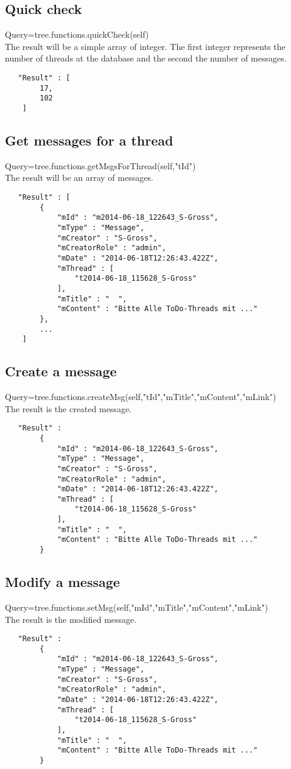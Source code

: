 \documentclass[12pt,a4paper,oneside]{report}
\begin{document}
\subsection{Quick check}
Query=tree.functions.quickCheck(self)\\
The result will be a simple array of integer. The first integer represents the number of threads at the database and the second the number of messages.

\begin{lstlisting}
   "Result" : [  
        17,
        102
    ]
\end{lstlisting}

\subsection{Get messages for a thread}
Query=tree.functions.getMsgsForThread(self,"tId")\\
The result will be an array of messages.
\begin{lstlisting}
   "Result" : [  
        { 
            "mId" : "m2014-06-18_122643_S-Gross",
            "mType" : "Message",
            "mCreator" : "S-Gross",
            "mCreatorRole" : "admin",
            "mDate" : "2014-06-18T12:26:43.422Z",
            "mThread" : [  
                "t2014-06-18_115628_S-Gross"
            ],
            "mTitle" : "  ",
            "mContent" : "Bitte Alle ToDo-Threads mit ..."
        },
        ...
    ]
\end{lstlisting}

\subsection{Create a message}
Query=tree.functions.createMsg(self,"tId","mTitle","mContent","mLink")\\
The result is the created message.
\begin{lstlisting}
   "Result" :   
        { 
            "mId" : "m2014-06-18_122643_S-Gross",
            "mType" : "Message",
            "mCreator" : "S-Gross",
            "mCreatorRole" : "admin",
            "mDate" : "2014-06-18T12:26:43.422Z",
            "mThread" : [  
                "t2014-06-18_115628_S-Gross"
            ],
            "mTitle" : "  ",
            "mContent" : "Bitte Alle ToDo-Threads mit ..."
        }
\end{lstlisting}

\subsection{Modify a message}
Query=tree.functions.setMsg(self,"mId","mTitle","mContent","mLink")\\
The result is the modified message.
\begin{lstlisting}
   "Result" :   
        { 
            "mId" : "m2014-06-18_122643_S-Gross",
            "mType" : "Message",
            "mCreator" : "S-Gross",
            "mCreatorRole" : "admin",
            "mDate" : "2014-06-18T12:26:43.422Z",
            "mThread" : [  
                "t2014-06-18_115628_S-Gross"
            ],
            "mTitle" : "  ",
            "mContent" : "Bitte Alle ToDo-Threads mit ..."
        }
\end{lstlisting}
\end{document}
